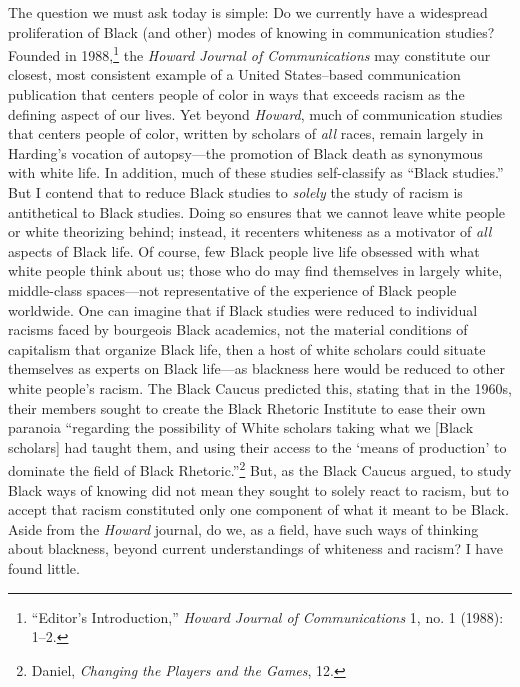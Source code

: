 \documentclass{tufte-handout}
\begin{document}
The question we must ask today is simple: Do we currently have a
widespread proliferation of Black (and other) modes of knowing in
communication studies? Founded in
1988,\footnote{``Editor's Introduction,'' \emph{Howard Journal of Communications} 1,
  no. 1 (1988): 1--2.
} the \emph{Howard Journal of
Communications} may constitute our closest, most consistent example of a
United States--based communication publication that centers people of
color in ways that exceeds racism as the defining aspect of our lives.
Yet beyond \emph{Howard}, much of communication studies that centers
people of color, written by scholars of \emph{all} races, remain largely
in Harding's vocation of autopsy---the promotion of Black death as
synonymous with white life. In addition, much of these studies
self-classify as ``Black studies.'' But I contend that to reduce Black
studies to \emph{solely} the study of racism is antithetical to Black
studies. Doing so ensures that we cannot leave white people or white
theorizing behind; instead, it recenters whiteness as a motivator of
\emph{all} aspects of Black life. Of course, few Black people live life
obsessed with what white people think about us; those who do may find
themselves in largely white, middle-class spaces---not representative of
the experience of Black people worldwide. One can imagine that if Black
studies were reduced to individual racisms faced by bourgeois Black
academics, not the material conditions of capitalism that organize Black
life, then a host of white scholars could situate themselves as experts
on Black life---as blackness here would be reduced to other white
people's racism. The Black Caucus predicted this, stating that in the
1960s, their members sought to create the Black Rhetoric Institute to
ease their own paranoia ``regarding the possibility of White scholars
taking what we {[}Black scholars{]} had taught them, and using their
access to the `means of production' to dominate the field of Black
Rhetoric.''\footnote{Daniel, \emph{Changing the Players and the Games}, 12.
} But, as the Black
Caucus argued, to study Black ways of knowing did not mean they sought
to solely react to racism, but to accept that racism constituted only
one component of what it meant to be Black. Aside from the \emph{Howard}
journal, do we, as a field, have such ways of thinking about blackness,
beyond current understandings of whiteness and racism? I have found
little.
\end{document}
